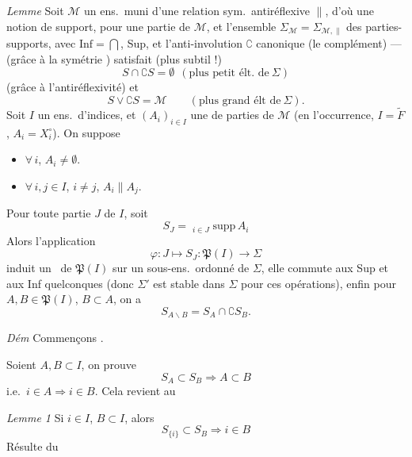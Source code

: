 \documentclass[11pt,a4paper]{article}
\begin{document}
\emph{Lemme} Soit $\mathcal{M}$ un ens.\ muni d'une relation sym.\ antiréflexive $\parallel$, d'où une notion de support,  pour une partie de $\mathcal{M}$, et l'ensemble $\Sigma_{\mathcal{M}} = \Sigma_{\mathcal{M}, \parallel}$ des parties-supports, avec $\mathrm{Inf} = \bigcap$, Sup, et l'anti-involution $\complement$ canonique (le complément) — (grâce à la symétrie ) satisfait (plus subtil !)
\[
  S \cap \complement S = \emptyset \ \ (\text{plus petit élt.\ de}\ \Sigma)
\]
(grâce à l'antiréflexivité) et 
\[
  S \vee \complement S = \mathcal{M} \qquad (\text{plus grand élt de}\ \Sigma) .
\]
Soit $I$ un ens.\ d'indices, et $(A_i)_{i \in I}$ une  de parties de $\mathcal{M}$ (en l'occurrence, $I = \widetilde{F}$, $A_i = X_i^{\circ}$). On suppose
\begin{itemize}
  \item[a)] $\forall\, i$, $A_i \neq \emptyset$.
  \item[b)] $\forall\, i, j \in I$, $i \neq j$, $A_i \parallel A_j$.
\end{itemize}
Pour toute partie $J$ de $I$, soit
\[
  S_J = \mathop{\mathrm{Sup}_{\Sigma}}_{i \in J} \mathrm{supp}\, A_i
\]
Alors l'application
\[
  \varphi : J \longmapsto S_J : \mathfrak{P}(I) \longrightarrow \Sigma
\]
 induit un \ de $\mathfrak{P}(I)$ sur un sous-ens.\ ordonné  de $\Sigma$, elle commute aux Sup et aux Inf quelconques (donc $\Sigma'$ est stable dans $\Sigma$ pour ces opérations), enfin pour $A, B \in \mathfrak{P}(I)$, $B \subset A$, on a
\[
  S_{A \smallsetminus B} = S_A \cap \complement S_B .
\]

\emph{Dém} Commençons .

Soient $A, B \subset I$, on prouve
\[
  S_A \subset S_B \Longrightarrow A \subset B
\]
i.e.\ $i \in A \Rightarrow i \in B$. Cela revient au 

\emph{Lemme 1} Si $i \in I$, \struck{\ill{} \ill{}} $B \subset I$, alors
\[
  S_{\lbrace i \rbrace} \subset S_B \Longrightarrow i \in B
\]
Résulte du
\end{document}
